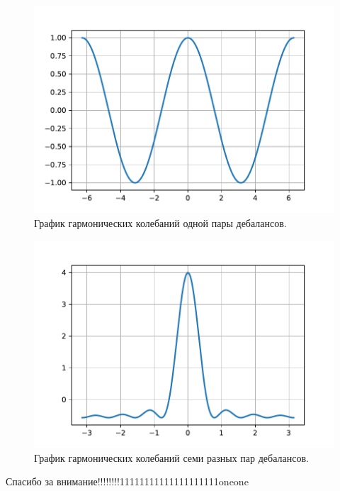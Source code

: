 \documentclass[10pt, pdf, hyperref={unicode}]{beamer}
\begin{document}
    \begin{frame}
        \begin{minipage}[h]{0.48\linewidth}
            \begin{figure}[h]
                \includegraphics[width=1\linewidth]{grap/impulse_1.pdf}
                \caption{График гармонических колебаний одной пары дебалансов.}
            \end{figure}
        \end{minipage}
        \hfill 
        \begin{minipage}[h]{0.48\linewidth}
            \begin{figure}[h]
                \includegraphics[width=1\linewidth]{grap/impulse_7.pdf}
                \caption{График гармонических колебаний семи разных пар дебалансов.}
            \end{figure}
        \end{minipage}
    \end{frame}


    \begin{frame}
        \centerline{\large Спасибо за внимание!!!!!!!!11111111111111111111oneone}
    \end{frame}
\end{document}
